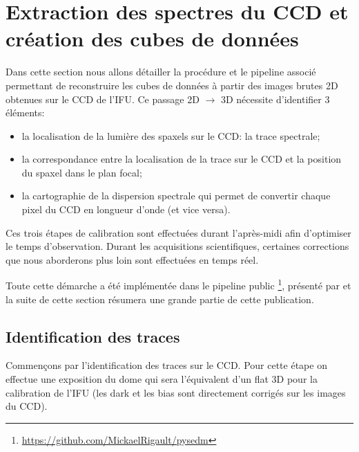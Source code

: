 \documentclass[../main/main.tex]{subfiles}
\begin{document}
  
\section{Extraction des spectres du CCD et création des cubes de données}
\label{sec:pysedmcube}

Dans cette section nous allons détailler la procédure et le pipeline
associé permettant de reconstruire les cubes de données à partir des
images brutes 2D obtenues sur le CCD de l'IFU. Ce passage 2D
$\rightarrow$ 3D nécessite d'identifier 3 éléments:

\begin{minipage}{\linewidth}
\begin{itemize}[label=$\diamondsuit$]
  \itemsep0em 
   \item la localisation de la lumière des spaxels sur le CCD: la trace spectrale;
   \item la correspondance entre la localisation de la trace sur le CCD et
     la position du spaxel dans le plan focal;
   \item la cartographie de la dispersion spectrale qui permet de
     convertir chaque pixel du CCD en longueur d'onde (et vice versa).
\end{itemize}
\end{minipage}
\vspace{0.1cm}

Ces trois étapes de calibration sont
effectuées durant l'après-midi afin d'optimiser le temps
d'observation. Durant les acquisitions scientifiques, certaines corrections que nous
aborderons plus loin sont effectuées en temps réel.

Toute cette démarche a été implémentée dans le pipeline public
\pysedm\footnote{\url{https://github.com/MickaelRigault/pysedm}}, présenté
par \citet{pysedm} et la suite de cette section résumera une grande partie de cette
publication.
\subsection{Identification des traces}\label{ssec:tracematch}
Commençons par l'identification des traces sur le CCD. Pour cette
étape on effectue une exposition du dome qui sera l'équivalent d'un flat 3D
pour la calibration de l'IFU (les dark et les bias sont directement
corrigés sur les images du CCD).
\vspace{0.1cm}
\end{document}
